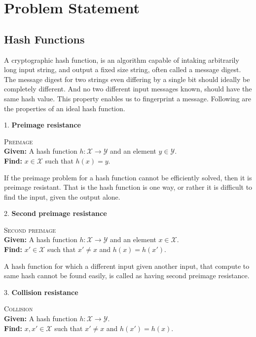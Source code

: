\documentclass[12pt]{artikel3}                  %
\begin{document}
\clearpage

\section{Problem Statement}

\subsection{Hash Functions}
A cryptographic hash function, is an algorithm capable of intaking arbitrarily long input string, and
output a fixed size string, often called a message digest. The message digest for two strings even 
differing by a single bit should ideally be completely different. And no two different input messages
known, should have the same hash value. This property enables us to fingerprint a message. Following 
are the properties of an ideal hash function\cite{00005}.
  
1. {\bf Preimage resistance}
\begin{center}
  \framebox
  {
    \parbox{350pt}
    {
      \centering \textsc{Preimage} \\
      {\bf Given:} A hash function $h : \mathcal{X} \to \mathcal{Y}$ and an element $y \in \mathcal{Y}$. \\
      {\bf Find:} $x \in \mathcal{X}$ such that $h(x) = y$. 
    }
  }
\end{center}
\vspace{4mm}
If the preimage problem for a hash function cannot be efficiently solved, then it is preimage resistant.
That is the hash function is one way, or rather it is difficult to find the input, given the output alone.

2. {\bf Second preimage resistance}
\begin{center}
  \framebox
  {
    \parbox{350pt}
    {
      \centering \textsc{Second preimage} \\
      {\bf Given:} A hash function $h : \mathcal{X} \to \mathcal{Y}$ and an element $x \in \mathcal{X}$. \\
      {\bf Find:} $x' \in \mathcal{X}$ such that $x' \neq x$ and $h(x) = h(x')$. 
    }
  }
\end{center}
\vspace{4mm}

A hash function for which a different input given another input, that compute to same hash cannot be found 
easily, is called as having second preimage resistance.

3. {\bf Collision resistance}
\begin{center}
  \framebox
  {
    \parbox{350pt}
    {
      \centering \textsc{Collision} \\
      {\bf Given:} A hash function $h : \mathcal{X} \to \mathcal{Y}$.  \\
      {\bf Find:} $x, x' \in \mathcal{X}$ such that $x' \neq x$ and $h(x') = h(x)$. 
    }
  }
\end{center}
\vspace{4mm}
\end{document}
